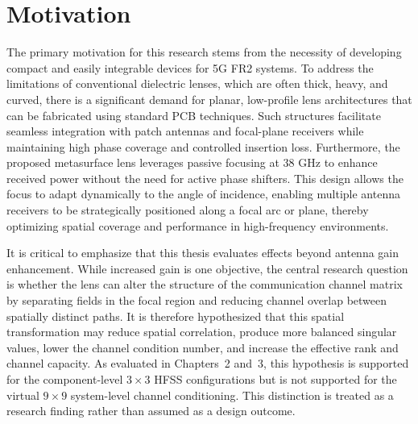 \section{Motivation}
The primary motivation for this research stems from the necessity of developing compact and easily integrable devices for 5G FR2 systems. To address the limitations of conventional dielectric lenses, which are often thick, heavy, and curved, there is a significant demand for planar, low-profile lens architectures that can be fabricated using standard PCB techniques. Such structures facilitate seamless integration with patch antennas and focal-plane receivers while maintaining high phase coverage and controlled insertion loss. Furthermore, the proposed metasurface lens leverages passive focusing at 38 GHz to enhance received power without the need for active phase shifters. This design allows the focus to adapt dynamically to the angle of incidence, enabling multiple antenna receivers to be strategically positioned along a focal arc or plane, thereby optimizing spatial coverage and performance in high-frequency environments.



It is critical to emphasize that this thesis evaluates effects beyond antenna gain enhancement. While increased gain is one objective, the central research question is whether the lens can alter the structure of the communication channel matrix by separating fields in the focal region and reducing channel overlap between spatially distinct paths. It is therefore hypothesized that this spatial transformation may reduce spatial correlation, produce more balanced singular values, lower the channel condition number, and increase the effective rank and channel capacity. As evaluated in Chapters~2 and~3, this hypothesis is supported for the component-level $3\times3$ HFSS configurations but is not supported for the virtual $9\times9$ system-level channel conditioning. This distinction is treated as a research finding rather than assumed as a design outcome.

